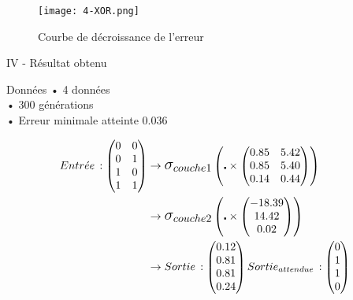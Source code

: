 \begin{frame}
\begin{figure}
	\centering
    \texttt{[image: 4-XOR.png]}
	\caption{Courbe de décroissance de l'erreur}
\end{figure}
\end{frame}

\begin{frame}{IV - Résultat obtenu}
\begin{block}{Données}
• 4 données \\
• 300 générations \\
• Erreur minimale atteinte 0.036
\end{block}
\begin{align*} 
Entr\acute{e} e\, :
\begin{pmatrix}
0 & 0 \\ 
0 & 1 \\ 
1 & 0 \\ 
1 & 1 
\end{pmatrix} 
		&\to  
\mathlarger{\mathlarger{\sigma_{couche1}}}
\left( \centerdot \times
\begin{pmatrix}
0.85 & 5.42 \\ 
0.85 & 5.40 \\ 
0.14 & 0.44
\end{pmatrix}
\right) \\ 
 		&\to
\mathlarger{\mathlarger{\sigma_{couche2}}}
\left( \centerdot \times
\begin{pmatrix}
-18.39\\ 
14.42 \\ 
0.02
\end{pmatrix}
\right) \\
 		&\to
Sortie\, :
\begin{pmatrix}
0.12 \\ 
0.81 \\ 
0.81 \\ 
0.24
\end{pmatrix}
Sortie_{attendue}\, :
\begin{pmatrix}
0 \\ 
1 \\ 
1 \\ 
0
\end{pmatrix}
\end{align*}
\end{frame}